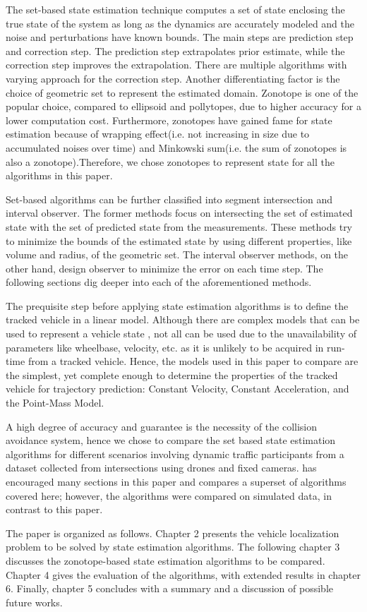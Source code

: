 The set-based state estimation technique computes a set of state enclosing the true state of the system as long as the dynamics are accurately modeled and the noise and perturbations have known bounds. The main steps are prediction step and correction step. The prediction step extrapolates prior estimate, while the correction step improves the extrapolation. There are multiple algorithms with varying approach for the correction step. Another differentiating factor is the choice of geometric set to represent the estimated domain. Zonotope is one of the popular choice, compared to ellipsoid and pollytopes, due to higher accuracy for a lower computation cost. Furthermore, zonotopes have gained fame for state estimation because of wrapping effect(i.e. not increasing in size due to accumulated noises over time) and Minkowski sum(i.e. the sum of zonotopes is also a zonotope).Therefore, we chose zonotopes to represent state for all the algorithms in this paper.

Set-based algorithms can be further classified into segment intersection and interval observer. The former methods focus on intersecting the set of estimated state with the set of predicted state from the measurements. These methods try to minimize the bounds of the estimated state by using different properties, like volume and radius, of the geometric set. The interval observer methods, on the other hand, design observer to minimize the error on each time step. The following sections dig deeper into each of the aforementioned methods.


The prequisite step before applying state estimation algorithms is to define the tracked vehicle in a linear model. Although there are complex models that can be used to represent a vehicle state \cite{Althoff}, not all can be used due to the unavailability of parameters like wheelbase, velocity, etc. as it is unlikely to be acquired in run-time from a tracked vehicle. Hence, the models used in this paper to compare are the simplest, yet complete enough to determine the properties of the tracked vehicle for trajectory prediction: Constant Velocity, Constant Acceleration, and the Point-Mass Model.

A high degree of accuracy and guarantee is the necessity of the collision avoidance system, hence we chose to compare the set based state estimation algorithms for different scenarios involving dynamic traffic participants from a dataset collected from intersections using drones and fixed cameras. \cite{Rath} has encouraged many sections in this paper and compares a superset of algorithms covered here; however, the algorithms were compared on simulated data, in contrast to this paper.

The paper is organized as follows. Chapter 2 presents the vehicle localization problem to be solved by state estimation algorithms. The following chapter 3 discusses the zonotope-based state estimation algorithms to be compared. Chapter 4 gives the evaluation of the algorithms, with extended results in chapter 6. Finally, chapter 5 concludes with a summary and a discussion of possible future works.




